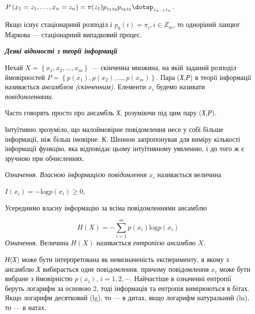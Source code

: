 \bigskip

{\centering
 ${P\left(x_{{1}}=z_{{1}},\dots,x_{{n}}=z_{{n}}\right)=\pi
(z_{{1}})p_{{z_{{1}}z_{{2}}}}p_{z_{{2}}z_{{3}}}{\dotsp_{z_{{n-1}}z_{{n}}}}}$.
\par}


\bigskip

Якщо існує стаціонарний розподіл  і   ${p_{{0}}(i)=\pi _{{i}},i\in Z_{{m}}}$, то
одноріний ланцюг Маркова --- стаціонарний випадковий процес.


\bigskip

{\centering\bfseries\itshape
Деякі відомості з теорії інформації
\par}

 Нехай  ${X=\left\{x_{{1}},x_{{2}},\dots,x_{{m}}\right\}}$ ---
скінченна множина, на якій заданий розподіл ймовірностей 
${P=\left\{p(x_{{1}}),p(x_{{2}}),\dots,p(x_{{m}})\right\}}$.
Пара (\textit{Х},\textit{Р}) в теорії інформації називається \textit{ансамблем
(скінченним)}. Елементи  ${x_{{i}}}$ будемо називати \textit{повідомленнями}.

 Часто говорять просто про ансамбль \textit{Х}, розуміючи під цим пару
(\textit{Х},\textit{Р}).

 Інтуїтивно зрозуміло, що малоймовірне повідомлення несе у собі  більше
інформації, ніж більш імовірне. К. Шеннон запропонував для виміру кількості
інформації функцію, яка відповідає цьому інтуїтивному уявленню, і до того ж  є
зручною при обчисленнях.

\textit{Означення.} \textit{ Власною інформацією повідомлення}  ${x_{{i}}}$
називається величина

{\centering
 ${I(x_{{i}})=-\text{log}p(x_{{i}})\ge 0}$,
\par}

 Усереднимо власну інформацію за всіма повідомленнями ансамблю

\begin{equation*}
{H(X)=-\overset{{m}}{\underset{{i=1}}{\sum }}{p(x_{{i}})\text{log}p(x_{{i}})}}
\end{equation*}
\textit{Означення.} Величина  ${H(X)}$ називається \textit{ентропією ансамблю} 
${X}$.

\textit{Н}(\textit{Х}) може бути інтерпретована як невизначеність експерименту,
в  якому  з ансамблю \textit{Х }вибирається одне повідомлення, причому
повідомлення   ${x_{{i}}}$ може бути вибране з ймовірністю ${p(x_{{i}})}$,
${i=1,2,\dotsm\text{.}}$ Найчастіше в означенні ентропії
беруть логарифм за основою 2, тоді інформація та ентропія вимірюються в бітах.
Якщо логарифм десятковий (lg), то --- в дитах, якщо логарифм натуральний (ln), то
--- в натах.


